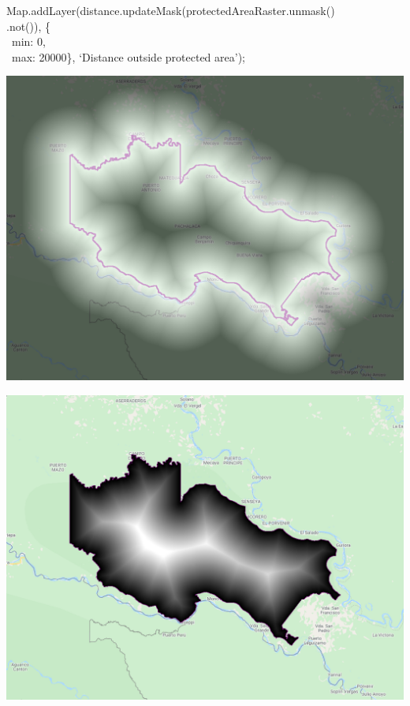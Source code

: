 \documentclass[
  letterpaper,
  DIV=11,
  numbers=noendperiod]{scrreprt}
\begin{document}
Map.addLayer(distance.updateMask(protectedAreaRaster.unmask()\\
.not()), \{\\
\hspace*{0.333em} ~min: 0,\\
\hspace*{0.333em} ~max: 20000\}, `Distance outside protected area');

\includegraphics{./F5/image56.png}

\includegraphics{./F5/image9.png}
\end{document}
